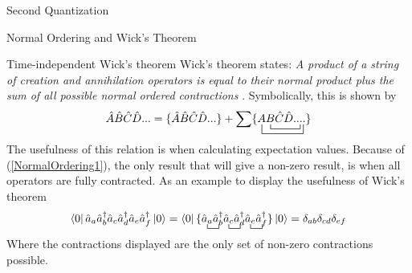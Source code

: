 \documentclass[twoside,english]{uiofysmaster}
\begin{document}
\begin{chapter}{Second Quantization}
\begin{section}{Normal Ordering and Wick's Theorem}
		\begin{subsection}{Time-independent Wick's theorem}
			Wick's theorem states: \textit{A product of a string of creation and annihilation operators is equal to their normal product plus the sum of all possible normal ordered contractions} \cite{ShavittAndBartlett}. Symbolically, this is shown by 
			\begin{align}
				\hat A \hat B \hat C \hat D ... = \{\hat A \hat B \hat C \hat D ... \} + \sum \{  \bcontraction[2ex]{}{\hat A}{\hat B \hat C \hat D ...}
				\hat A \bcontraction{}{\hat B}{\hat C \hat D ..}
				\hat B \hat C \hat D .... \}
			\end{align}
			The usefulness of this relation is when calculating expectation values. Because of (\ref{NormalOrdering1}), the only result that will give a non-zero result, is when all operators are fully contracted. As an example to display the usefulness of Wick's theorem 
			\begin{align}
				\left< 0 \right| \hat a_a \hat a_b^\dagger \hat a_c \hat a_d^\dagger \hat a_e \hat a_f^\dagger \left| 0 \right> = \left< 0 \right| \{ 
				\bcontraction{}{\hat a_a}{}{\hat a_b^\dagger}
				\hat a_a \hat a_b^\dagger \bcontraction{}{\hat a_c}{}{\hat a_d^\dagger}
				\hat a_c \hat a_d^\dagger \bcontraction{}{\hat a_e}{}{\hat a_f^\dagger}
				\hat a_e \hat a_f^\dagger 
				\} \left| 0 \right> = \delta_{ab} \delta_{cd} \delta_{ef}
			\end{align}
			Where the contractions displayed are the only set of non-zero contractions possible. 
		\end{subsection}
	\end{section}


\end{chapter}
\end{document}
